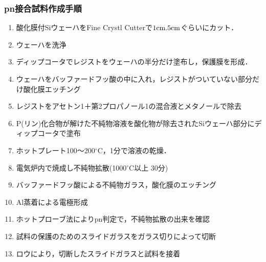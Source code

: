 \documentclass[11pt]{jarticle}
\begin{document}
		\subsubsection{pn接合試料作成手順}
			\begin{enumerate}
				\item 酸化膜付SiウェーハをFine Crystl Cutterで$1\mathrm{cm} \time 2.5\mathrm{cm}$ぐらいにカット．
				\item ウェーハを洗浄
				\item ディップコータでレジストをウェーハの半分だけ塗布し，保護膜を形成．
				\item ウェーハをバッファードフッ酸の中に入れ，レジストがついていない部分だけ酸化膜エッチング
				\item レジストをアセトン1＋第2プロパノール1の混合液とメタノールで除去
				\item P(リン)化合物が解けた不純物溶液を酸化物が除去されたSiウェーハ部分にディップコータで塗布
					  
				\item ホットプレート100～200$^\circ \mathrm{C}$，1分で溶液の乾燥．
				\item 電気炉内で焼成し不純物拡散(1000$^\circ \mathrm{C}$以上 30分)
				\item バッファードフッ酸による不純物ガラス，酸化膜のエッチング
				\item Al蒸着による電極形成
				\item ホットプローブ法によりpn判定で，不純物拡散の出来を確認
				\item 試料の保護のためのスライドガラスをガラス切りによって切断
				\item ロウにより，切断したスライドガラスと試料を接着
			\end{enumerate}
\end{document}

